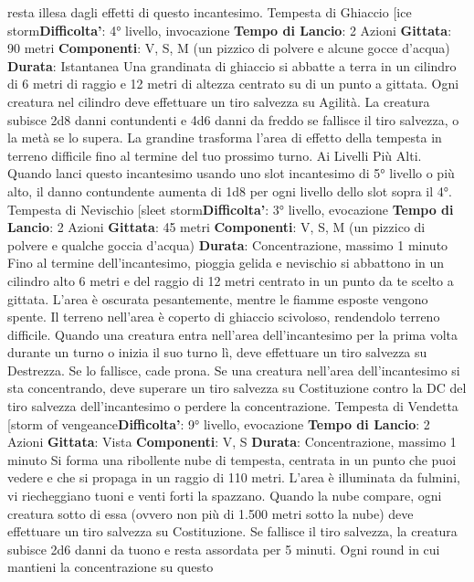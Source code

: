 \begin{multicols}{2}
resta illesa dagli effetti di questo incantesimo.
Tempesta di Ghiaccio
[ice storm\textbf{Difficolta'}:
4° livello, invocazione
\textbf{Tempo di Lancio}: 2 Azioni
\textbf{Gittata}: 90 metri
\textbf{Componenti}: V, S, M (un pizzico di polvere e alcune
gocce d’acqua)
\textbf{Durata}: Istantanea
Una grandinata di ghiaccio si abbatte a terra in un
cilindro di 6 metri di raggio e 12 metri di altezza centrato
su di un punto a gittata. Ogni creatura nel cilindro deve
effettuare un tiro salvezza su Agilità. La creatura
subisce 2d8 danni contundenti e 4d6 danni da freddo
se fallisce il tiro salvezza, o la metà se lo supera.
La grandine trasforma l’area di effetto della tempesta in
terreno difficile fino al termine del tuo prossimo turno.
Ai Livelli Più Alti. Quando lanci questo incantesimo
usando uno slot incantesimo di 5° livello o più alto, il
danno contundente aumenta di 1d8 per ogni livello dello
slot sopra il 4°.
Tempesta di Nevischio
[sleet storm\textbf{Difficolta'}:
3° livello, evocazione
\textbf{Tempo di Lancio}: 2 Azioni
\textbf{Gittata}: 45 metri
\textbf{Componenti}: V, S, M (un pizzico di polvere e qualche
goccia d’acqua)
\textbf{Durata}: Concentrazione, massimo 1 minuto
Fino al termine dell’incantesimo, pioggia gelida e
nevischio si abbattono in un cilindro alto 6 metri e del
raggio di 12 metri centrato in un punto da te scelto a
gittata. L’area è oscurata pesantemente, mentre le
fiamme esposte vengono spente.
Il terreno nell’area è coperto di ghiaccio scivoloso,
rendendolo terreno difficile. Quando una creatura entra
nell’area dell’incantesimo per la prima volta durante un
turno o inizia il suo turno lì, deve effettuare un tiro
salvezza su Destrezza. Se lo fallisce, cade prona.
Se una creatura nell’area dell’incantesimo si sta
concentrando, deve superare un tiro salvezza su
Costituzione contro la DC del tiro salvezza
dell’incantesimo o perdere la concentrazione.
Tempesta di Vendetta
[storm of vengeance\textbf{Difficolta'}:
9° livello, evocazione
\textbf{Tempo di Lancio}: 2 Azioni
\textbf{Gittata}: Vista
\textbf{Componenti}: V, S
\textbf{Durata}: Concentrazione, massimo 1 minuto
Si forma una ribollente nube di tempesta, centrata in un
punto che puoi vedere e che si propaga in un raggio di
110 metri. L’area è illuminata da fulmini, vi riecheggiano
tuoni e venti forti la spazzano. Quando la nube
compare, ogni creatura sotto di essa (ovvero non più di
1.500 metri sotto la nube) deve effettuare un tiro
salvezza su Costituzione. Se fallisce il tiro salvezza, la
creatura subisce 2d6 danni da tuono e resta assordata
per 5 minuti.
Ogni round in cui mantieni la concentrazione su questo

\end{multicols}
